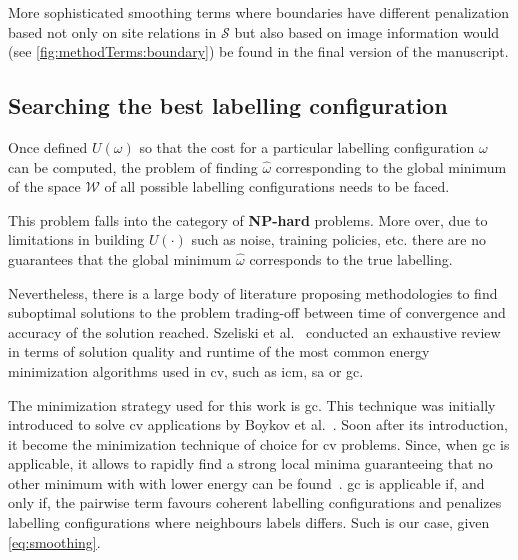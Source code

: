 More sophisticated smoothing terms where boundaries have different penalization based not only on site relations in $\mathcal{S}$ but also based on image information would (see \cref{fig:methodTerms:boundary}) be found in the final version of the manuscript.%


\subsection{Searching the best labelling configuration}
Once defined $U(\omega)$ so that the cost for a particular labelling configuration $\omega$ can be computed, the problem of finding $\hat{\omega}$ corresponding to the global minimum of the space $\mathcal{W}$ of all possible labelling configurations needs to be faced. 

This problem falls into the category of \textbf{NP-hard} problems. 
More over, due to limitations in building $U(\cdot)$ such as noise, training policies, etc. there are no guarantees that the global minimum $\hat{\omega}$ corresponds to the true labelling.

Nevertheless, there is a large body of literature proposing methodologies to find suboptimal solutions to the problem trading-off between time of convergence and accuracy of the solution reached.
Szeliski et al.~\cite{szeliski2008comparative} conducted an exhaustive review in terms of solution quality and runtime of the most common energy minimization algorithms used in \ac{cv}, such as \ac{icm}, \ac{sa} or \ac{gc}.

The minimization strategy used for this work is \ac{gc}. 
This technique was initially introduced to solve \ac{cv} applications by Boykov et al.~\cite{boykov2001fast}.
Soon after its introduction, it become the minimization technique of choice for \ac{cv} problems.
Since, when \ac{gc} is applicable, it allows to rapidly find a strong local minima guaranteeing that no other minimum with with lower energy can be found~\cite{delong2012fast}. 
\ac{gc} is applicable if, and only if, the pairwise term favours coherent labelling configurations and penalizes labelling configurations where neighbours labels differs. 
Such is our case, given \cref{eq:smoothing}.

